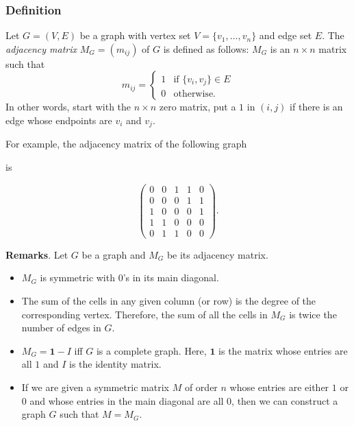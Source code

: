 \documentclass[12pt]{article}
\begin{document}
\subsubsection*{Definition}

Let $G=(V,E)$ be a graph with vertex set $V=\lbrace v_1,\ldots, v_n \rbrace$ and edge set $E$.  The \emph{adjacency matrix} $M_G=(m_{ij})$ of $G$ is defined as follows: $M_G$ is an $n\times n$ matrix such that
\begin{displaymath}
m_{ij} = \left \lbrace
\begin{array}{ll}
1 & \textrm{if $\lbrace v_i,v_j\rbrace \in E$}\\
0 & \textrm{otherwise.}
\end{array}
\right.
\end{displaymath}
In other words, start with the $n\times n$ zero matrix, put a $1$ in  $(i,j)$ if there is an edge whose endpoints are $v_i$ and $v_j$.

For example, the adjacency matrix of the following graph 

\begin{figure}[!h]
\centering
{}
\end{figure}

is 

$$\begin{pmatrix}
0 & 0 & 1 & 1 & 0 \\
0 & 0 & 0 & 1 & 1 \\
1 & 0 & 0 & 0 & 1 \\
1 & 1 & 0 & 0 & 0 \\
0 & 1 & 1 & 0 & 0 
\end{pmatrix}.$$

\textbf{Remarks}.  Let $G$ be a graph and $M_G$ be its adjacency matrix.
\begin{itemize}
\item $M_G$ is symmetric with $0$'s in its main diagonal.
\item The sum of the cells in any given column (or row) is the degree of the corresponding vertex.  Therefore, the sum of all the cells in $M_G$ is twice the number of edges in $G$.
\item $M_G=\mathbf{1}-I$ iff $G$ is a complete graph.  Here, $\mathbf{1}$ is the matrix whose entries are all $1$ and $I$ is the identity matrix.
\item If we are given a symmetric matrix $M$ of order $n$ whose entries are either $1$ or $0$ and whose entries in the main diagonal are all $0$, then we can construct a graph $G$ such that $M=M_G$.
\end{itemize}
\end{document}
